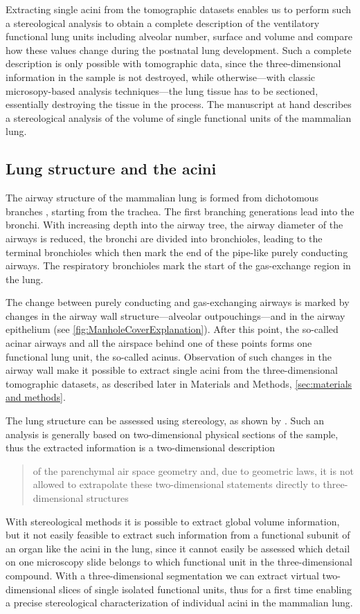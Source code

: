 \documentclass[twoside,paper=a4,abstract=true,english,DIVcalc]{scrartcl}
\begin{document}
Extracting single acini from the tomographic datasets enables us to perform such a stereological analysis to obtain a complete description of the ventilatory functional lung units including alveolar number, surface and volume and compare how these values change during the postnatal lung development. Such a complete description is only possible with tomographic data, since the three-dimensional information in the sample is not destroyed, while otherwise---with classic microsopy-based analysis techniques---the lung tissue has to be sectioned, essentially destroying the tissue in the process. The manuscript at hand describes a stereological analysis of the volume of single functional units of the mammalian lung.

\subsection{Lung structure and the acini}
The airway structure of the mammalian lung is formed from dichotomous branches \cite{Weibel1991}, starting from the trachea. The first branching generations lead into the bronchi. With increasing depth into the airway tree, the airway diameter of the airways is reduced, the bronchi are divided into bronchioles, leading to the terminal bronchioles which then mark the end of the pipe-like purely conducting airways. The respiratory bronchioles mark the start of the gas-exchange region in the lung.

The change between purely conducting and gas-exchanging airways is marked by changes in the airway wall structure---alveolar outpouchings---and in the airway epithelium (see \autoref{fig:ManholeCoverExplanation}). After this point, the so-called acinar airways and all the airspace behind one of these points forms one functional lung unit, the so-called acinus. Observation of such changes in the airway wall make it possible to extract single acini from the three-dimensional tomographic datasets, as described later in Materials and Methods, \autoref{sec:materials and methods}.

The lung structure can be assessed using stereology, as shown by \citet{Hsia2010,Tschanz2002}. Such an analysis is generally based on two-dimensional physical sections of the sample, thus the extracted information is a two-dimensional description \blockquote[\cite{Tschanz2002}]{of the parenchymal air space geometry and, due to geometric laws, it is not allowed to extrapolate these two-dimensional statements directly to three-dimensional structures}. With stereological methods it is possible to extract global volume information, but it not easily feasible to extract such information from a functional subunit of an organ like the acini in the lung, since it cannot easily be assessed which detail on one microscopy slide belongs to which functional unit in the three-dimensional compound. With a three-dimensional segmentation we can extract virtual two-dimensional slices of single isolated functional units, thus for a first time enabling a precise stereological characterization of individual acini in the mammalian lung.
\end{document}
